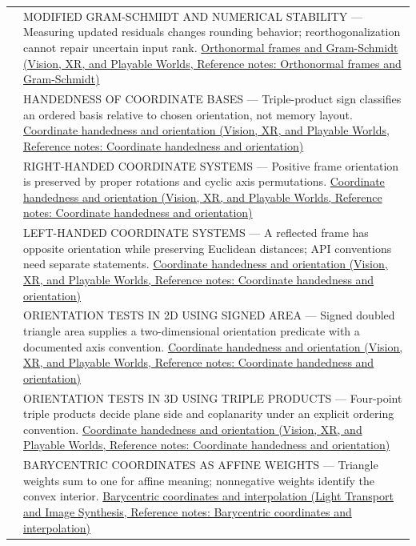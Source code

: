 {\begin{longtable}[]{@{}
  >{\raggedright\arraybackslash}p{}
  >{\raggedright\arraybackslash}p{}@{}}
562 & MODIFIED GRAM-SCHMIDT AND NUMERICAL STABILITY --- Measuring updated residuals changes rounding behavior; reorthogonalization cannot repair uncertain input rank. \href{../07-Vision-XR-and-Playable-Worlds/main.pdf\#nameddest=appendix-c39f1ed34271}{Orthonormal frames and Gram-Schmidt (Vision, XR, and Playable Worlds, Reference notes: Orthonormal frames and Gram-Schmidt)} \\
563 & HANDEDNESS OF COORDINATE BASES --- Triple-product sign classifies an ordered basis relative to chosen orientation, not memory layout. \href{../07-Vision-XR-and-Playable-Worlds/main.pdf\#nameddest=appendix-87d7626c8d37}{Coordinate handedness and orientation (Vision, XR, and Playable Worlds, Reference notes: Coordinate handedness and orientation)} \\
564 & RIGHT-HANDED COORDINATE SYSTEMS --- Positive frame orientation is preserved by proper rotations and cyclic axis permutations. \href{../07-Vision-XR-and-Playable-Worlds/main.pdf\#nameddest=appendix-87d7626c8d37}{Coordinate handedness and orientation (Vision, XR, and Playable Worlds, Reference notes: Coordinate handedness and orientation)} \\
565 & LEFT-HANDED COORDINATE SYSTEMS --- A reflected frame has opposite orientation while preserving Euclidean distances; API conventions need separate statements. \href{../07-Vision-XR-and-Playable-Worlds/main.pdf\#nameddest=appendix-87d7626c8d37}{Coordinate handedness and orientation (Vision, XR, and Playable Worlds, Reference notes: Coordinate handedness and orientation)} \\
566 & ORIENTATION TESTS IN 2D USING SIGNED AREA --- Signed doubled triangle area supplies a two-dimensional orientation predicate with a documented axis convention. \href{../07-Vision-XR-and-Playable-Worlds/main.pdf\#nameddest=appendix-87d7626c8d37}{Coordinate handedness and orientation (Vision, XR, and Playable Worlds, Reference notes: Coordinate handedness and orientation)} \\
567 & ORIENTATION TESTS IN 3D USING TRIPLE PRODUCTS --- Four-point triple products decide plane side and coplanarity under an explicit ordering convention. \href{../07-Vision-XR-and-Playable-Worlds/main.pdf\#nameddest=appendix-87d7626c8d37}{Coordinate handedness and orientation (Vision, XR, and Playable Worlds, Reference notes: Coordinate handedness and orientation)} \\
568 & BARYCENTRIC COORDINATES AS AFFINE WEIGHTS --- Triangle weights sum to one for affine meaning; nonnegative weights identify the convex interior. \href{../04-Light-Transport-and-Image-Synthesis/main.pdf\#nameddest=appendix-02b9d9a81dca}{Barycentric coordinates and interpolation (Light Transport and Image Synthesis, Reference notes: Barycentric coordinates and interpolation)} \\

\end{longtable}}
